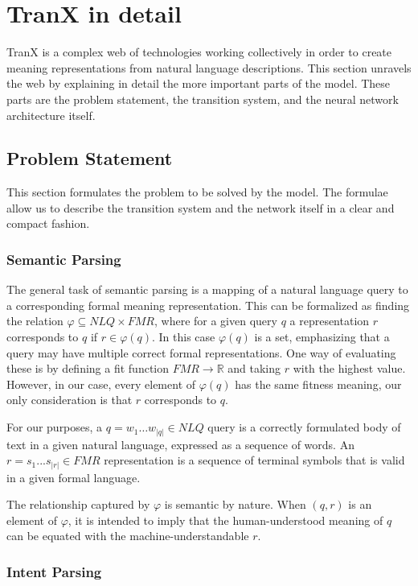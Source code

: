 \section{TranX in detail}
TranX is a complex web of technologies working collectively in order to create meaning
representations from natural language descriptions. This section unravels the web by
explaining in detail the more important parts of the model. These parts are the problem
statement, the transition system, and the neural network architecture itself.

\subsection{Problem Statement}
This section formulates the problem to be solved by the model. The formulae allow
us to describe the transition system and the network itself in a clear and compact
fashion.

\subsubsection{Semantic Parsing}\label{sec:parsing}

The general task of semantic parsing is a mapping of a natural language query to a
corresponding formal meaning representation. This can be formalized as finding
the relation \(\varphi \subseteq NLQ \times FMR\)\label{form:fmr}, where for
a given query \(q\) a representation \(r\) corresponds to \(q\) if 
\(r \in \varphi(q)\). In this case \( \varphi(q) \) is a set, emphasizing
that a query may have multiple correct formal representations. One way of 
evaluating these is by defining a fit function \( FMR \to \mathbb{R} \)
and taking \( r \) with the highest value. However, in our case, every
element of \( \varphi(q) \) has the same fitness meaning, our only
consideration is that \(r\) corresponds to \(q\).

For our purposes, a \(q = w_{1} \dots w_{|q|} \in NLQ\) query is a correctly
formulated body of text in a given natural language, expressed as a sequence of words.
An \(r = s_{1} ... s_{|r|} \in FMR\) representation is a sequence of terminal symbols
that is valid in a given formal language.

The relationship captured by \(\varphi\) is semantic by nature. When \((q, r)\) is
an element of \(\varphi\), it is intended to imply that the human-understood
meaning of \(q\) can be equated with the machine-understandable \(r\). 
 
\subsubsection{Intent Parsing}

